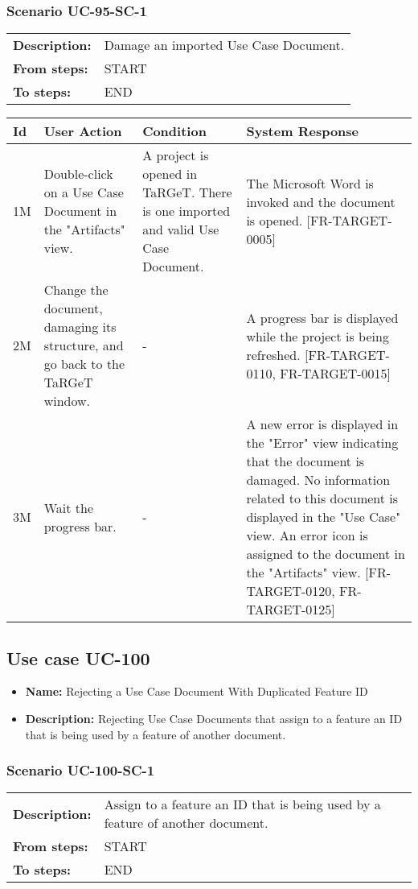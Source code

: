 \documentclass[a4paper,11pt]{article}
\newcommand{\bl}{\\ \hline}
\begin{document}
\subsubsection*{Scenario UC-95-SC-1}
\begin{tabular}{p{1in}p{4in}}
{\bf Description:} & Damage an imported Use Case Document. \\
{\bf From steps:} & START \\
{\bf To steps:} & END \\
\end{tabular}
 
\begin{tabular}{|p{0.8in}|p{1.6in}|p{1.6in}|p{1.6in}|}
\hline
Id & User Action & Condition & System Response  \bl 
1M & Double-click on a Use Case Document in the "Artifacts" view. & A project is opened in TaRGeT. There is one imported and valid Use Case Document. & The Microsoft Word is invoked and the document is opened. [FR-TARGET-0005] \bl 
2M & Change the document, damaging its structure, and go back to the TaRGeT window. & - & A progress bar is displayed while the project is being refreshed. [FR-TARGET-0110, FR-TARGET-0015] \bl 
3M & Wait the progress bar. & - & A new error is displayed in the "Error" view indicating that the document is damaged. No information related to this document is displayed in the "Use Case" view. An error icon is assigned to the document in the "Artifacts" view. [FR-TARGET-0120, FR-TARGET-0125] \bl 
\end{tabular}
\subsection*{Use case UC-100}
\begin{itemize}
\item {\bf Name: }Rejecting a Use Case Document With Duplicated Feature ID
\item {\bf Description: }Rejecting Use Case Documents that assign to a feature an ID that is being used by a feature of another document.
\end{itemize}
\subsubsection*{Scenario UC-100-SC-1}
\begin{tabular}{p{1in}p{4in}}
{\bf Description:} & Assign to a feature an ID that is being used by a feature of another document. \\
{\bf From steps:} & START \\
{\bf To steps:} & END \\
\end{tabular}
 
\end{document}
